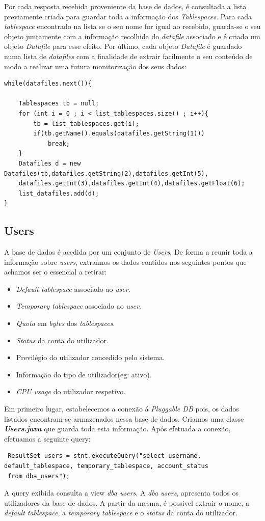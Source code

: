 Por cada resposta recebida proveniente da base de dados, é consultada a lista previamente criada para guardar toda a informação dos \textit{Tablespaces}. Para cada \textit{tablespace} encontrado na lista se o seu nome for igual ao recebido, guarda-se o seu objeto juntamente com a informação recolhida do \textit{datafile}  associado e é criado um objeto \textit{Datafile} para esse efeito. Por último, cada objeto \textit{Datafile} é guardado numa lista de \textit{datafiles} com a finalidade de extrair facilmente o seu conteúdo de modo a realizar uma futura monitorização dos seus dados:
\vspace{2mm}
\begin{lstlisting}
while(datafiles.next()){
           
    Tablespaces tb = null;
    for (int i = 0 ; i < list_tablespaces.size() ; i++){
        tb = list_tablespaces.get(i);
        if(tb.getName().equals(datafiles.getString(1)))
            break;
    }
    Datafiles d = new Datafiles(tb,datafiles.getString(2),datafiles.getInt(5),
    datafiles.getInt(3),datafiles.getInt(4),datafiles.getFloat(6);
    list_datafiles.add(d);
} 
\end{lstlisting}
\subsection*{Users}
A base de dados é acedida por um conjunto de \textit{Users}. De forma a reunir toda a informação sobre \textit{users}, extraímos os dados contidos nos seguintes pontos que achamos ser o essencial a retirar:
\begin{itemize}
    \item \textit{Default tablespace} associado ao \textit{user}.
    \item \textit{Temporary tablespace} associado ao \textit{user}.
    \item \textit{Quota} em \textit{bytes} dos \textit{tablespaces}.
    \item \textit{Status} da conta do utilizador.
    \item Previlégio do utilizador concedido pelo sistema.
    \item Informação do tipo de utilizador(eg: ativo).
    \item \textit{CPU usage} do utilizador respetivo.
\end{itemize}
Em primeiro lugar, estabelecemos a conexão á \textit{Pluggable DB} pois, os dados listados encontram-se armazenados nessa base de dados. Criamos uma classe \textbf{\textit{Users.java}} que guarda toda esta informação. Após efetuada a conexão, efetuamos a seguinte query:
\vspace{2mm}
\begin{lstlisting}
 ResultSet users = stnt.executeQuery("select username, default_tablespace, temporary_tablespace, account_status 
 from dba_users");
\end{lstlisting}
\vspace{2mm}
A query exibida consulta a view \textit{dba users}. A \textit{dba users}, apresenta todos os utilizadores da base de dados. A partir da mesma, é possivel extrair o nome, a \textit{default tablespace}, a \textit{temporary tablespace} e o \textit{status} da conta do utilizador.

